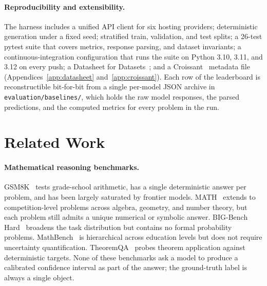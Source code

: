 \documentclass{article}
\begin{document}
\paragraph{Reproducibility and extensibility.}
The harness includes a unified API client for six hosting providers; deterministic generation under a fixed seed; stratified train, validation, and test splits; a 26-test pytest suite that covers metrics, response parsing, and dataset invariants; a continuous-integration configuration that runs the suite on Python 3.10, 3.11, and 3.12 on every push; a Datasheet for Datasets~\citep{gebru2021}; and a Croissant~\citep{croissant2024} metadata file (Appendices~\ref{app:datasheet} and~\ref{app:croissant}). Each row of the leaderboard is reconstructible bit-for-bit from a single per-model JSON archive in \texttt{evaluation/baselines/}, which holds the raw model responses, the parsed predictions, and the computed metrics for every problem in the run.


\section{Related Work}
\label{sec:related}

\paragraph{Mathematical reasoning benchmarks.}
GSM8K~\citep{gsm8k} tests grade-school arithmetic, has a single deterministic answer per problem, and has been largely saturated by frontier models. MATH~\citep{math} extends to competition-level problems across algebra, geometry, and number theory, but each problem still admits a unique numerical or symbolic answer. BIG-Bench Hard~\citep{bigbench} broadens the task distribution but contains no formal probability problems. MathBench~\citep{liu2024} is hierarchical across education levels but does not require uncertainty quantification. TheoremQA~\citep{chen2023} probes theorem application against deterministic targets. None of these benchmarks ask a model to produce a calibrated confidence interval as part of the answer; the ground-truth label is always a single object.
\end{document}
